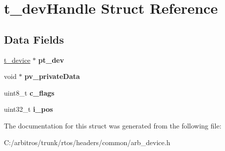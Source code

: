 \hypertarget{structt__dev_handle}{\section{t\-\_\-dev\-Handle Struct Reference}
\label{structt__dev_handle}
}
\subsection*{Data Fields}
\begin{DoxyCompactItemize}
\item 
\hypertarget{structt__dev_handle_a9165a740126b0b9b05baca4031068799}{\hyperlink{structt__device}{t\-\_\-device} $\ast$ {\bfseries pt\-\_\-dev}}\label{structt__dev_handle_a9165a740126b0b9b05baca4031068799}

\item 
\hypertarget{structt__dev_handle_ac887556b30da2524683efe030d31a3e6}{void $\ast$ {\bfseries pv\-\_\-private\-Data}}\label{structt__dev_handle_ac887556b30da2524683efe030d31a3e6}

\item 
\hypertarget{structt__dev_handle_ac1bb37023c6646f713c7b97e109df684}{uint8\-\_\-t {\bfseries c\-\_\-flags}}\label{structt__dev_handle_ac1bb37023c6646f713c7b97e109df684}

\item 
\hypertarget{structt__dev_handle_a28fdd5ba1cfe7d7de9f98926ef3761d5}{uint32\-\_\-t {\bfseries i\-\_\-pos}}\label{structt__dev_handle_a28fdd5ba1cfe7d7de9f98926ef3761d5}

\end{DoxyCompactItemize}


The documentation for this struct was generated from the following file\-:\begin{DoxyCompactItemize}
\item 
C\-:/arbitros/trunk/rtos/headers/common/arb\-\_\-device.\-h\end{DoxyCompactItemize}
